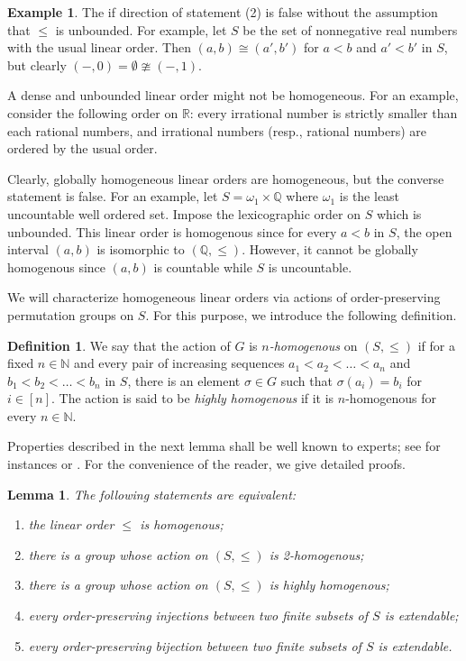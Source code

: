 \documentclass[11pt, reqno]{amsart}
\theoremstyle{plain}
\newtheorem{lemma}[theorem]{Lemma}
\numberwithin{equation}{section}
\theoremstyle{definition}
\newtheorem{definition}[theorem]{Definition}
\newtheorem{example}[theorem]{Example}
\begin{document}
\begin{example}
The if direction of statement (2) is false without the assumption that $\leqslant$ is unbounded. For example, let $S$ be the set of nonnegative real numbers with the usual linear order. Then $(a, b) \cong (a', b')$ for $a < b$ and $a' < b'$ in $S$, but clearly $(-, 0) = \emptyset \ncong (-, 1)$.

A dense and unbounded linear order might not be homogeneous. For an example, consider the following order on $\mathbb{R}$: every irrational number is strictly smaller than each rational numbers, and irrational numbers (resp., rational numbers) are ordered by the usual order.

Clearly, globally homogeneous linear orders are homogeneous, but the converse statement is false. For an example, let $S = \omega_1 \times \mathbb{Q}$ where $\omega_1$ is the least uncountable well ordered set. Impose the lexicographic order on $S$ which is unbounded. This linear order is homogenous since for every $a < b$ in $S$, the open interval $(a, b)$ is isomorphic to $(\mathbb{Q}, \leqslant)$. However, it cannot be globally homogenous since $(a, b)$ is countable while $S$ is uncountable.
\end{example}

We will characterize homogeneous linear orders via actions of order-preserving permutation groups on $S$. For this purpose, we introduce the following definition.

\begin{definition} \cite[Definition 3.16]{BMMN}
We say that the action of $G$ is \textit{$n$-homogenous} on $(S, \leqslant)$ if for a fixed $n \in \mathbb{N}$ and every pair of increasing sequences $a_1 < a_2 < \ldots < a_n$ and $b_1 < b_2 < \ldots < b_n$ in $S$, there is an element $\sigma \in G$ such that $\sigma(a_i) = b_i$ for $i \in [n]$. The action is said to be \textit{highly homogenous} if it is $n$-homogenous for every $n \in \mathbb{N}$.
\end{definition}

Properties described in the next lemma shall be well known to experts; see for instances \cite{BMMN} or \cite{Ca}. For the convenience of the reader, we give detailed proofs.

\begin{lemma} \label{elementary properties}
The following statements are equivalent:
\begin{enumerate}
\item the linear order $\leqslant$ is homogenous;

\item there is a group whose action on $(S, \leqslant)$ is 2-homogenous;

\item there is a group whose action on $(S, \leqslant)$ is highly homogenous;

\item every order-preserving injections between two finite subsets of $S$ is extendable;

\item every order-preserving bijection between two finite subsets of $S$ is extendable.
\end{enumerate}
\end{lemma}
\end{document}
